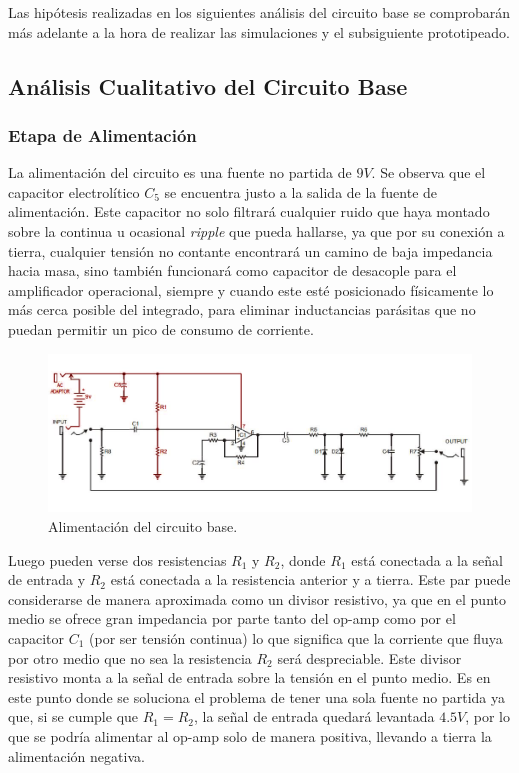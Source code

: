 



Las hipótesis realizadas en los siguientes análisis del circuito base se comprobarán más adelante a la hora de realizar las simulaciones y el subsiguiente prototipeado.

\subsection{Análisis Cualitativo del Circuito Base}

\subsubsection{Etapa de Alimentación}

La alimentación del circuito es una fuente no partida de $9V$. Se observa que el capacitor electrolítico $C_5$ se encuentra justo a la salida de la fuente de alimentación. Este capacitor no solo filtrará cualquier ruido que haya montado sobre la continua u ocasional \textit{ripple} que pueda hallarse, ya que por su conexión a tierra, cualquier tensión no contante encontrará un camino de baja impedancia hacia masa, sino también funcionará como capacitor de desacople para el amplificador operacional, siempre y cuando este esté posicionado físicamente lo más cerca posible del integrado, para eliminar inductancias parásitas que no puedan permitir un pico de consumo de corriente.

\begin{figure}[H]
	\centering
	\includegraphics[width=1\textwidth, trim={0 0 0 0}, clip]{Ejercicio5/Imagenes/Circuito_base/circuito_base_alimentacion.png}
	\caption{Alimentación del circuito base.}
	\label{fig:circuito_base_alimentacion}
\end{figure}

Luego pueden verse dos resistencias $R_1$ y $R_2$, donde $R_1$ está conectada a la señal de entrada y $R_2$ está conectada a la resistencia anterior y a tierra. Este par puede considerarse de manera aproximada como un divisor resistivo, ya que en el punto medio se ofrece gran impedancia por parte tanto del op-amp como por el capacitor $C_1$ (por ser tensión continua) lo que significa que la corriente que fluya por otro medio que no sea la resistencia $R_2$ será despreciable.
Este divisor resistivo monta a la señal de entrada sobre la tensión en el punto medio. Es en este punto donde se soluciona el problema de tener una sola fuente no partida ya que, si se cumple que $R_1=R_2$, la señal de entrada quedará levantada $4.5V$, por lo que se podría alimentar al op-amp solo de manera positiva, llevando a tierra la alimentación negativa.\\

